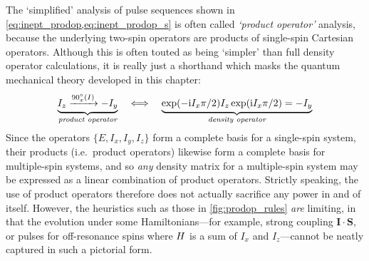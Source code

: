 The `simplified' analysis of pulse sequences shown in \cref{eq:inept_prodop,eq:inept_prodop_s} is often called \textit{`product operator'} analysis\autocite{Sorensen1984PNMRS}, because the underlying two-spin operators are products of single-spin Cartesian operators.
Although this is often touted as being `simpler' than full density operator calculations, it is really just a shorthand which masks the quantum mechanical theory developed in this chapter:
\begin{equation}
    \label{eq:product_operator_shorthand}
    \underbrace{I_z \xrightarrow{90^\circ_x(I)} -I_y}_{\textit{product operator}}
    \quad\Longleftrightarrow\quad
    \underbrace{\exp(-\mathrm{i} I_x\pi/2)I_z\exp(\mathrm{i} I_x\pi/2) = -I_y}_{\textit{density operator}}
\end{equation}
Since the operators $\{E, I_x, I_y, I_z\}$ form a complete basis for a single-spin system, their products (i.e.\ product operators) likewise form a complete basis for multiple-spin systems, and so \textit{any} density matrix for a multiple-spin system may be expressed as a linear combination of product operators.
Strictly speaking, the use of product operators therefore does not actually sacrifice any power in and of itself.
However, the heuristics such as those in \cref{fig:prodop_rules} \textit{are} limiting, in that the evolution under some Hamiltonians---for example, strong coupling $\symbf{I}\cdot\symbf{S}$, or pulses for off-resonance spins where $H\/$ is a sum of $I_x$ and $I_z$---cannot be neatly captured in such a pictorial form.
